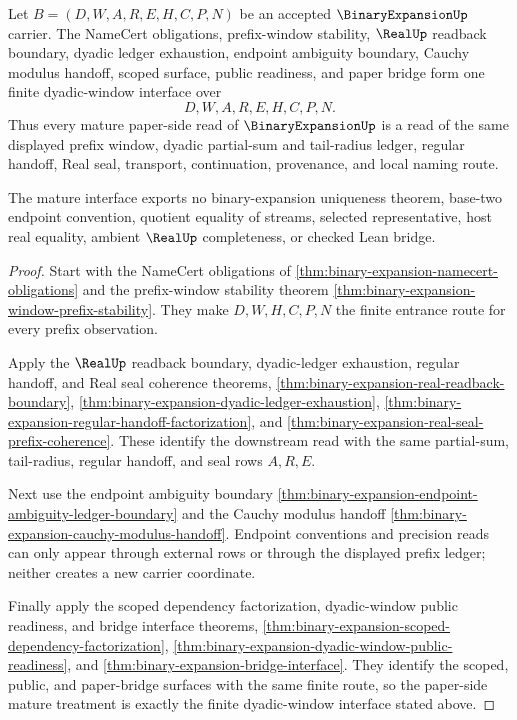 \begin{theorem}
\label{thm:binary-expansion-mature-treatment}
Let $B=(D,W,A,R,E,H,C,P,N)$ be an accepted $\BinaryExpansionUp$ carrier. The NameCert obligations, prefix-window stability, $\RealUp$ readback boundary, dyadic ledger exhaustion, endpoint ambiguity boundary, Cauchy modulus handoff, scoped surface, public readiness, and paper bridge form one finite dyadic-window interface over
$$
D,W,A,R,E,H,C,P,N .
$$
Thus every mature paper-side read of $\BinaryExpansionUp$ is a read of the same displayed prefix window, dyadic partial-sum and tail-radius ledger, regular handoff, Real seal, transport, continuation, provenance, and local naming route.

The mature interface exports no binary-expansion uniqueness theorem, base-two endpoint convention, quotient equality of streams, selected representative, host real equality, ambient $\RealUp$ completeness, or checked Lean bridge.
\end{theorem}
\begin{proof}
Start with the NameCert obligations of \autoref{thm:binary-expansion-namecert-obligations} and the prefix-window stability theorem \autoref{thm:binary-expansion-window-prefix-stability}. They make $D,W,H,C,P,N$ the finite entrance route for every prefix observation.

Apply the $\RealUp$ readback boundary, dyadic-ledger exhaustion, regular handoff, and Real seal coherence theorems, \autoref{thm:binary-expansion-real-readback-boundary}, \autoref{thm:binary-expansion-dyadic-ledger-exhaustion}, \autoref{thm:binary-expansion-regular-handoff-factorization}, and \autoref{thm:binary-expansion-real-seal-prefix-coherence}. These identify the downstream read with the same partial-sum, tail-radius, regular handoff, and seal rows $A,R,E$.

Next use the endpoint ambiguity boundary \autoref{thm:binary-expansion-endpoint-ambiguity-ledger-boundary} and the Cauchy modulus handoff \autoref{thm:binary-expansion-cauchy-modulus-handoff}. Endpoint conventions and precision reads can only appear through external rows or through the displayed prefix ledger; neither creates a new carrier coordinate.

Finally apply the scoped dependency factorization, dyadic-window public readiness, and bridge interface theorems, \autoref{thm:binary-expansion-scoped-dependency-factorization}, \autoref{thm:binary-expansion-dyadic-window-public-readiness}, and \autoref{thm:binary-expansion-bridge-interface}. They identify the scoped, public, and paper-bridge surfaces with the same finite route, so the paper-side mature treatment is exactly the finite dyadic-window interface stated above.
\end{proof}

